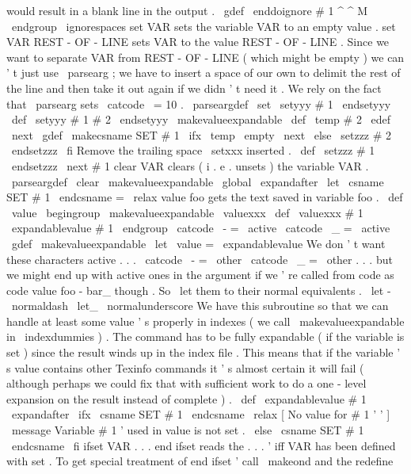 {{{{%
would
result
in
a
blank
line
in
the
output
.
\
gdef
\
enddoignore
#
1
^
^
M
{
\
endgroup
\
ignorespaces
}
%
}
%
set
VAR
sets
the
variable
VAR
to
an
empty
value
.
%
set
VAR
REST
-
OF
-
LINE
sets
VAR
to
the
value
REST
-
OF
-
LINE
.
%
%
Since
we
want
to
separate
VAR
from
REST
-
OF
-
LINE
(
which
might
be
%
empty
)
we
can
'
t
just
use
\
parsearg
;
we
have
to
insert
a
space
of
our
%
own
to
delimit
the
rest
of
the
line
and
then
take
it
out
again
if
we
%
didn
'
t
need
it
.
%
We
rely
on
the
fact
that
\
parsearg
sets
\
catcode
\
=
10
.
%
\
parseargdef
\
set
{
\
setyyy
#
1
\
endsetyyy
}
\
def
\
setyyy
#
1
#
2
\
endsetyyy
{
%
{
%
\
makevalueexpandable
\
def
\
temp
{
#
2
}
%
\
edef
\
next
{
\
gdef
\
makecsname
{
SET
#
1
}
}
%
\
ifx
\
temp
\
empty
\
next
{
}
%
\
else
\
setzzz
#
2
\
endsetzzz
\
fi
}
%
}
%
Remove
the
trailing
space
\
setxxx
inserted
.
\
def
\
setzzz
#
1
\
endsetzzz
{
\
next
{
#
1
}
}
%
clear
VAR
clears
(
i
.
e
.
unsets
)
the
variable
VAR
.
%
\
parseargdef
\
clear
{
%
{
%
\
makevalueexpandable
\
global
\
expandafter
\
let
\
csname
SET
#
1
\
endcsname
=
\
relax
}
%
}
%
value
{
foo
}
gets
the
text
saved
in
variable
foo
.
\
def
\
value
{
\
begingroup
\
makevalueexpandable
\
valuexxx
}
\
def
\
valuexxx
#
1
{
\
expandablevalue
{
#
1
}
\
endgroup
}
{
\
catcode
\
-
=
\
active
\
catcode
\
_
=
\
active
%
\
gdef
\
makevalueexpandable
{
%
\
let
\
value
=
\
expandablevalue
%
We
don
'
t
want
these
characters
active
.
.
.
\
catcode
\
-
=
\
other
\
catcode
\
_
=
\
other
%
.
.
.
but
we
might
end
up
with
active
ones
in
the
argument
if
%
we
'
re
called
from
code
as
code
{
value
{
foo
-
bar_
}
}
though
.
%
So
\
let
them
to
their
normal
equivalents
.
\
let
-
\
normaldash
\
let_
\
normalunderscore
}
}
%
We
have
this
subroutine
so
that
we
can
handle
at
least
some
value
'
s
%
properly
in
indexes
(
we
call
\
makevalueexpandable
in
\
indexdummies
)
.
%
The
command
has
to
be
fully
expandable
(
if
the
variable
is
set
)
since
%
the
result
winds
up
in
the
index
file
.
This
means
that
if
the
%
variable
'
s
value
contains
other
Texinfo
commands
it
'
s
almost
certain
%
it
will
fail
(
although
perhaps
we
could
fix
that
with
sufficient
work
%
to
do
a
one
-
level
expansion
on
the
result
instead
of
complete
)
.
%
\
def
\
expandablevalue
#
1
{
%
\
expandafter
\
ifx
\
csname
SET
#
1
\
endcsname
\
relax
{
[
No
value
for
#
1
'
'
]
}
%
\
message
{
Variable
#
1
'
used
in
value
is
not
set
.
}
%
\
else
\
csname
SET
#
1
\
endcsname
\
fi
}
%
ifset
VAR
.
.
.
end
ifset
reads
the
.
.
.
'
iff
VAR
has
been
defined
%
with
set
.
%
%
To
get
special
treatment
of
end
ifset
'
call
\
makeond
and
the
redefine
}}}
